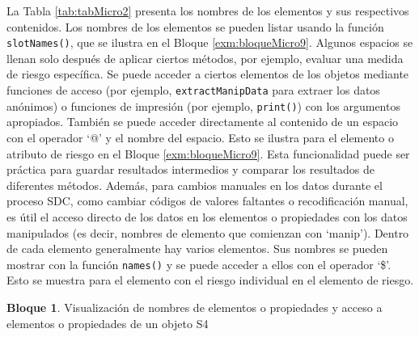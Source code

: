 \documentclass[]{book}
\newenvironment{Shaded}{\begin{snugshade}}{\end{snugshade}}
\newcommand{\CommentTok}[1]{\textcolor[rgb]{0.56,0.35,0.01}{\textit{#1}}}
\newcommand{\KeywordTok}[1]{\textcolor[rgb]{0.13,0.29,0.53}{\textbf{#1}}}
\newcommand{\NormalTok}[1]{#1}
\newcommand{\OperatorTok}[1]{\textcolor[rgb]{0.81,0.36,0.00}{\textbf{#1}}}
\newcommand{\StringTok}[1]{\textcolor[rgb]{0.31,0.60,0.02}{#1}}
\theoremstyle{definition}
\theoremstyle{definition}
\newtheorem{example}{Bloque}[chapter]
\theoremstyle{definition}
\theoremstyle{definition}
\theoremstyle{remark}
\begin{document}
La Tabla \ref{tab:tabMicro2} presenta los nombres de los elementos y sus respectivos contenidos. Los nombres de los elementos se pueden listar usando la función \texttt{slotNames()}, que se ilustra en el Bloque \ref{exm:bloqueMicro9}. Algunos espacios se llenan solo después de aplicar ciertos métodos, por ejemplo, evaluar una medida de riesgo específica. Se puede acceder a ciertos elementos de los objetos mediante funciones de acceso (por ejemplo, \texttt{extractManipData} para extraer los datos anónimos) o funciones de impresión (por ejemplo, \texttt{print()}) con los argumentos apropiados. También se puede acceder directamente al contenido de un espacio con el operador `@' y el nombre del espacio. Esto se ilustra para el elemento o atributo de riesgo en el Bloque \ref{exm:bloqueMicro9}. Esta funcionalidad puede ser práctica para guardar resultados intermedios y comparar los resultados de diferentes métodos. Además, para cambios manuales en los datos durante el proceso SDC, como cambiar códigos de valores faltantes o recodificación manual, es útil el acceso directo de los datos en los elementos o propiedades con los datos manipulados (es decir, nombres de elemento que comienzan con `manip'). Dentro de cada elemento generalmente hay varios elementos. Sus nombres se pueden mostrar con la función \texttt{names()} y se puede acceder a ellos con el operador `\$'. Esto se muestra para el elemento con el riesgo individual en el elemento de riesgo.

\begin{example}
\protect\hypertarget{exm:bloqueMicro9}{}{\label{exm:bloqueMicro9} }Visualización de nombres de elementos o propiedades y acceso a elementos o propiedades de un objeto S4
\end{example}

\begin{Shaded}
\end{Shaded}
\end{document}
